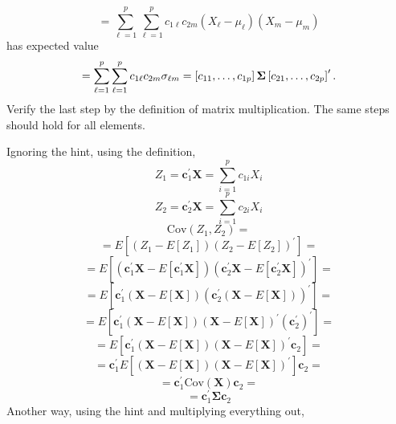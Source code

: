 \begin{enumerate}[font=\bfseries]
\[        \]
        \[
            =
            \sum_{\ell = 1}^p{\sum_{\ell = 1}^p{c_{1\ell}c_{2m}\left(X_\ell - \mu_\ell\right)\left(X_m - \mu_m\right)}}
        \]
        has expected value
        \[
            =
            \sum_{\ell = 1}^p{\sum_{\ell = 1}^p{c_{1\ell}c_{2m}\sigma_{\ell m}}}
            =
            \left[c_{11}, \dots, c_{1p}\right]\bold{\Sigma}\left[c_{21}, \dots, c_{2p}\right]^\prime.
        \]
        Verify the last step by the definition of matrix multiplication. The same steps should hold for all elements.
        \newline
        \par
        Ignoring the hint, using the definition,
        \[
            Z_1 = \mathbf{c}_1^\prime\mathbf{X} = \sum_{i=1}^p{c_{1i}X_i}
        \]
        \[
            Z_2 = \mathbf{c}_2^\prime\mathbf{X} = \sum_{i=1}^p{c_{2i}X_i}
        \]
        \[
            \text{Cov}\left(Z_1, Z_2\right)
            =
        \]
        \[
            =
            E\left[\left(Z_1 - E\left[Z_1\right]\right){\left(Z_2 - E\left[Z_2\right]\right)}^\prime\right]
            =
        \]
        \[
            =
            E\left[\left(\mathbf{c}_1^\prime\mathbf{X} - E\left[\mathbf{c}_1^\prime\mathbf{X}\right]\right){\left(\mathbf{c}_2^\prime\mathbf{X} - E\left[\mathbf{c}_2^\prime\mathbf{X}\right]\right)}^\prime\right]
            =
        \]
        \[
            =
            E\left[\mathbf{c}_1^\prime\left(\mathbf{X} - E\left[\mathbf{X}\right]\right){\left(\mathbf{c}_2^\prime\left(\mathbf{X} - E\left[\mathbf{X}\right]\right)\right)}^\prime\right]
            =
        \]
        \[
            =
            E\left[\mathbf{c}_1^\prime\left(\mathbf{X} - E\left[\mathbf{X}\right]\right){\left(\mathbf{X} - E\left[\mathbf{X}\right]\right)}^\prime\left(\mathbf{c}_2^\prime\right)^\prime\right]
            =
        \]
        \[
            =
            E\left[\mathbf{c}_1^\prime\left(\mathbf{X} - E\left[\mathbf{X}\right]\right){\left(\mathbf{X} - E\left[\mathbf{X}\right]\right)}^\prime\mathbf{c}_2\right]
            =
        \]
        \[
            =
            \mathbf{c}_1^\prime E\left[\left(\mathbf{X} - E\left[\mathbf{X}\right]\right){\left(\mathbf{X} - E\left[\mathbf{X}\right]\right)}^\prime\right]\mathbf{c}_2
            =
        \]
        \[
            =
            \mathbf{c}_1^\prime \text{Cov}\left(\mathbf{X}\right)\mathbf{c}_2
            =
        \]
        \[
            =
            \mathbf{c}_1^\prime \mathbf{\Sigma}\mathbf{c}_2
        \]
        Another way, using the hint and multiplying everything out,

\end{enumerate}
